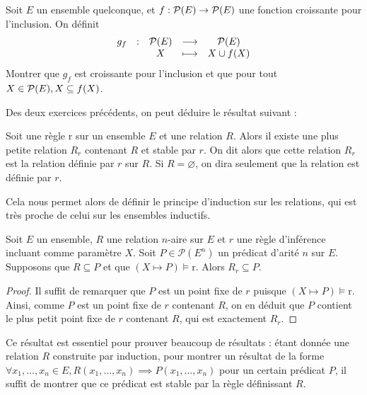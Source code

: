 \begin{exercise}
  Soit $E$ un ensemble quelconque, et $f : \mathcal{P}(E) \to \mathcal{P}(E)$ une
  fonction croissante pour l'inclusion. On définit
  \[\begin{array}{ccccc}
    g_f & : & \mathcal{P}(E) & \longrightarrow & \mathcal{P}(E)\\
    & & X & \longmapsto & X \cup f(X)
  \end{array}\]
  Montrer que $g_f$ est croissante pour l'inclusion et que pour tout
  $X\in\mathcal{P}(E), X\subseteq f(X)$.
\end{exercise}

Des deux exercices précédents, on peut déduire le résultat suivant :

\begin{corollary}
  Soit une règle $\mathrm r$ sur un ensemble $E$ et une relation $R$. Alors il
  existe une plus petite relation $R_r$ contenant $R$ et stable par $r$. On dit
  alors que cette relation $R_r$ est la relation définie par $r$ sur $R$. Si
  $R = \varnothing$, on dira seulement que la relation est définie par $r$.
\end{corollary}

Cela nous permet alors de définir le principe d'induction sur les relations,
qui est très proche de celui sur les ensembles inductifs.

\begin{theorem}
  Soit $E$ un ensemble, $R$ une relation $n$-aire sur $E$ et $r$ une règle
  d'inférence incluant comme paramètre $X$. Soit $P \in \mathcal P(E^n)$
  un prédicat d'arité $n$ sur $E$. Supposons que $R\subseteq P$ et que
  $(X\mapsto P)\models \mathrm r$. Alors $R_r\subseteq P$.
\end{theorem}

\begin{proof}
  Il suffit de remarquer que $P$ est un point fixe de $r$ puisque
  $(X\mapsto P)\models \mathrm r$. Ainsi, comme $P$ est un point fixe de $r$
  contenant $R$, on en déduit que $P$ contient le plus petit point fixe de $r$
  contenant $R$, qui est exactement $R_r$.
\end{proof}

Ce résultat est essentiel pour prouver beaucoup de résultats : étant donnée une
relation $R$ construite par induction, pour montrer un résultat de la forme
$\forall x_1,\ldots,x_n\in E, R(x_1,\ldots,x_n)\implies P(x_1,\ldots,x_n)$ pour
un certain prédicat $P$, il suffit de montrer que ce prédicat est stable par
la règle définissant $R$.

